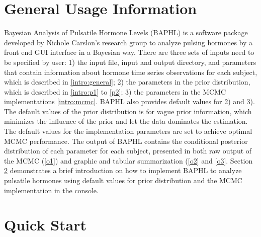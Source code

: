 \documentclass[11pt]{book}
\begin{document}
\section{General Usage Information}
Bayesian Analysis of Pulsatile Hormone Levels (BAPHL) is a software package developed by Nichole Carslon's research group to analyze pulsing hormones by a front end GUI interface in a Bayesian way. There are three sets of inputs need to be specified by user: 1) the input file, input and output directory,  and parameters that contain information about hormone time series observations for each subject, which is described in \ref{intro:general}; 2) the parameters in the prior distribution, which is described in \ref{intro:p1} to \ref{p2}; 3) the parameters in the MCMC implementations \ref{intro:mcmc}. BAPHL also provides default values for 2) and 3). The default values of the prior distribution is for vague prior information, which minimizes the influence of the prior and let the data dominates the estimation. The default values for the implementation parameters are set to achieve optimal MCMC performance. The output of BAPHL contains the conditional posterior distribution of each parameter for each subject, presented in both raw output of the MCMC (\ref{o1}) and graphic and tabular summarization (\ref{o2} and \ref{o3}. Section \ref{qs} demonstrates a brief introduction on how to implement BAPHL to analyze pulsatile hormones using default values for prior distribution and the MCMC implementation in the console.

\newpage
\section{Quick Start} \label{qs}
\end{document}
